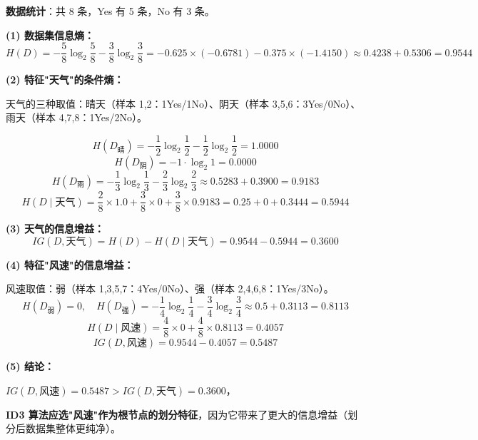 \documentclass[a4paper,11pt]{ctexart}
\begin{document}
\begin{solutionbox}[参考答案与详细解析]
    \textbf{数据统计}：共 8 条，Yes 有 5 条，No 有 3 条。

    \textbf{(1) 数据集信息熵：}
    \[
    H(D) = -\frac{5}{8}\log_2\frac{5}{8} - \frac{3}{8}\log_2\frac{3}{8}
    = -0.625 \times (-0.6781) - 0.375 \times (-1.4150)
    \approx 0.4238 + 0.5306 = \mathbf{0.9544}
    \]

    \textbf{(2) 特征"天气"的条件熵：}

    天气的三种取值：晴天（样本 1,2：1Yes/1No）、阴天（样本 3,5,6：3Yes/0No）、雨天（样本 4,7,8：1Yes/2No）。

    \[
    H(D_{\text{晴}}) = -\frac{1}{2}\log_2\frac{1}{2} - \frac{1}{2}\log_2\frac{1}{2} = 1.0000
    \]
    \[
    H(D_{\text{阴}}) = -1\cdot\log_2 1 = 0.0000
    \]
    \[
    H(D_{\text{雨}}) = -\frac{1}{3}\log_2\frac{1}{3} - \frac{2}{3}\log_2\frac{2}{3}
    \approx 0.5283 + 0.3900 = 0.9183
    \]
    \[
    H(D \mid \text{天气}) = \frac{2}{8}\times1.0 + \frac{3}{8}\times0 + \frac{3}{8}\times0.9183
    = 0.25 + 0 + 0.3444 = \mathbf{0.5944}
    \]

    \textbf{(3) 天气的信息增益：}
    \[
    IG(D, \text{天气}) = H(D) - H(D\mid\text{天气}) = 0.9544 - 0.5944 = \mathbf{0.3600}
    \]

    \textbf{(4) 特征"风速"的信息增益：}

    风速取值：弱（样本 1,3,5,7：4Yes/0No）、强（样本 2,4,6,8：1Yes/3No）。
    \[
    H(D_{\text{弱}}) = 0, \quad H(D_{\text{强}}) = -\frac{1}{4}\log_2\frac{1}{4} - \frac{3}{4}\log_2\frac{3}{4} \approx 0.5 + 0.3113 = 0.8113
    \]
    \[
    H(D\mid\text{风速}) = \frac{4}{8}\times 0 + \frac{4}{8}\times 0.8113 = \mathbf{0.4057}
    \]
    \[
    IG(D, \text{风速}) = 0.9544 - 0.4057 = \mathbf{0.5487}
    \]

    \textbf{(5) 结论：}

    $IG(D, \text{风速}) = 0.5487 > IG(D, \text{天气}) = 0.3600$，

    \textbf{ID3 算法应选"风速"作为根节点的划分特征}，因为它带来了更大的信息增益（划分后数据集整体更纯净）。
\end{solutionbox}
\end{document}
